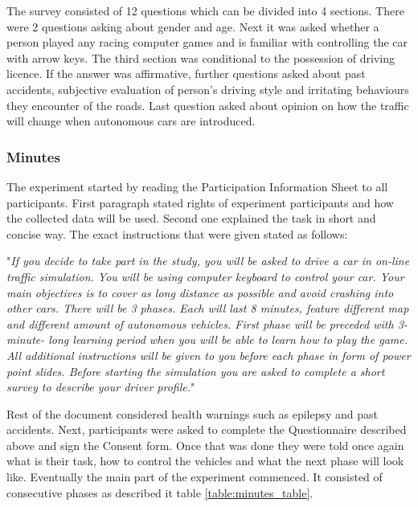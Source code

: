 \documentclass[11pt,english]{article}
\begin{document}
The survey consisted of 12 questions which can be divided into 4 sections. There were 2 questions asking about gender and age. Next it was asked whether a person played any racing computer games and is familiar with controlling the car with arrow keys. The third section was conditional to the possession of driving licence. If the answer was affirmative, further questions asked about past accidents, subjective evaluation of person's driving style and irritating behaviours they encounter of the roads.
Last question asked about opinion on how the traffic will change when autonomous cars are introduced. 




\subsubsection{Minutes}

The experiment started by reading the Participation Information Sheet to all participants. First paragraph stated rights of experiment participants and how the collected data will be used. Second one explained the task in short and concise way. The exact instructions that were given stated as follows:

"\textit{If you decide to take part in the study, you will be asked to drive a car in on-line traffic simulation. You will be using computer keyboard to control your car. Your main objectives is to cover as long distance as possible and avoid crashing into other cars. There will be 3 phases. Each will last 8 minutes, feature different map and different amount of autonomous vehicles. First phase will be preceded with 3-minute- long learning period when you will be able to learn how to play the game. All additional instructions will be given to you before each phase in form of power point slides. Before starting the simulation you are asked to complete a short survey to describe your driver profile.}"

Rest of the document considered health warnings such as epilepsy and past accidents. Next, participants were asked to complete the Questionnaire described above and sign the Consent form. Once that was done they were told once again what is their task, how to control the vehicles and what the next phase will look like. Eventually the main part of the experiment commenced. It consisted of consecutive phases as described it table \ref{table:minutes_table}.
\end{document}
